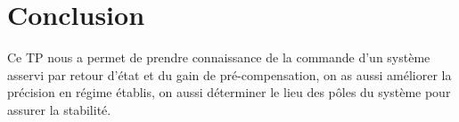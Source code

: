 \chapter*{Conclusion}
Ce TP nous a permet de prendre connaissance de la commande d'un système asservi par  retour d'état et du gain de pré-compensation, on as aussi améliorer la précision en régime établis, on aussi déterminer le lieu des pôles du système pour assurer la stabilité.
